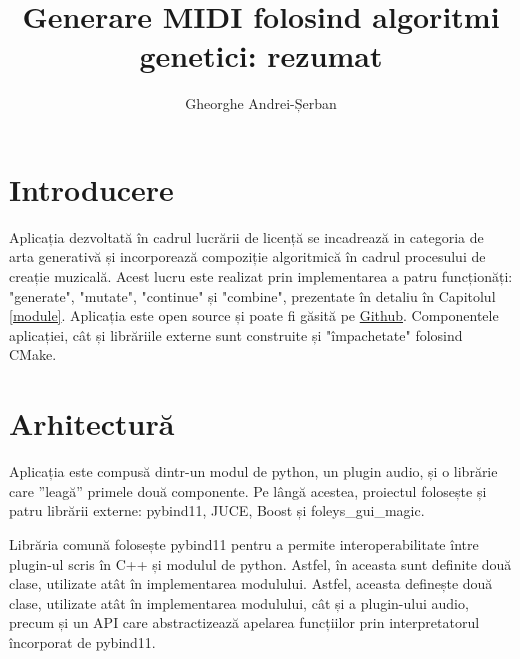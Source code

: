 \documentclass[11pt]{article}
\title{Generare MIDI folosind algoritmi genetici: rezumat}
\author{Gheorghe Andrei-Șerban}
\begin{document}
\maketitle

\section{Introducere}
Aplicația dezvoltată în cadrul lucrării de licență se incadrează in categoria de arta generativă și incorporează compoziție algoritmică în cadrul procesului de creație muzicală. Acest lucru este realizat prin implementarea a patru funcționăți: "generate", "mutate", "continue" și "combine", prezentate în detaliu în Capitolul \ref{module}. Aplicația este open source și poate fi găsită pe \hyperlink{https://github.com/speedypleath/b2bAI}{Github}. Componentele aplicației, cât și librăriile externe sunt construite și "împachetate" folosind CMake. 

\section{Arhitectură}
Aplicația este compusă dintr-un modul de python, un plugin audio, și o librărie care ”leagă” primele două componente. Pe lângă acestea, proiectul folosește și patru librării externe: pybind11, JUCE, Boost și foleys\_gui\_magic. \par
Librăria comună folosește pybind11 pentru a permite interoperabilitate între plugin-ul scris în C++ și modulul de python. Astfel, în aceasta sunt definite două clase, utilizate atât în implementarea modulului. Astfel, aceasta definește două clase, utilizate atât în implementarea modulului, cât și a plugin-ului audio, precum și un API care abstractizează apelarea funcțiilor prin interpretatorul încorporat de pybind11.
\end{document}
